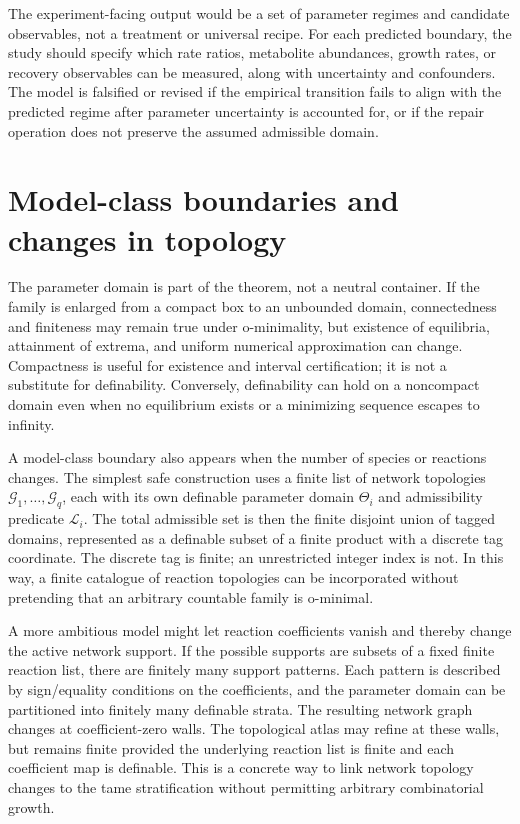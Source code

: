 \documentclass[11pt,a4paper]{article}
\theoremstyle{definition}
\theoremstyle{remark}
\newcommand{\Life}{\mathcal{L}}
\begin{document}
The experiment-facing output would be a set of parameter regimes and candidate observables, not a treatment or universal recipe. For each predicted boundary, the study should specify which rate ratios, metabolite abundances, growth rates, or recovery observables can be measured, along with uncertainty and confounders. The model is falsified or revised if the empirical transition fails to align with the predicted regime after parameter uncertainty is accounted for, or if the repair operation does not preserve the assumed admissible domain.


\section{Model-class boundaries and changes in topology}
The parameter domain is part of the theorem, not a neutral container. If the family is enlarged from a compact box to an unbounded domain, connectedness and finiteness may remain true under o-minimality, but existence of equilibria, attainment of extrema, and uniform numerical approximation can change. Compactness is useful for existence and interval certification; it is not a substitute for definability. Conversely, definability can hold on a noncompact domain even when no equilibrium exists or a minimizing sequence escapes to infinity.

A model-class boundary also appears when the number of species or reactions changes. The simplest safe construction uses a finite list of network topologies \(\mathcal{G}_1,\ldots,\mathcal{G}_q\), each with its own definable parameter domain \(\Theta_i\) and admissibility predicate \(\Life_i\). The total admissible set is then the finite disjoint union of tagged domains, represented as a definable subset of a finite product with a discrete tag coordinate. The discrete tag is finite; an unrestricted integer index is not. In this way, a finite catalogue of reaction topologies can be incorporated without pretending that an arbitrary countable family is o-minimal.

A more ambitious model might let reaction coefficients vanish and thereby change the active network support. If the possible supports are subsets of a fixed finite reaction list, there are finitely many support patterns. Each pattern is described by sign/equality conditions on the coefficients, and the parameter domain can be partitioned into finitely many definable strata. The resulting network graph changes at coefficient-zero walls. The topological atlas may refine at these walls, but remains finite provided the underlying reaction list is finite and each coefficient map is definable. This is a concrete way to link network topology changes to the tame stratification without permitting arbitrary combinatorial growth.
\end{document}
